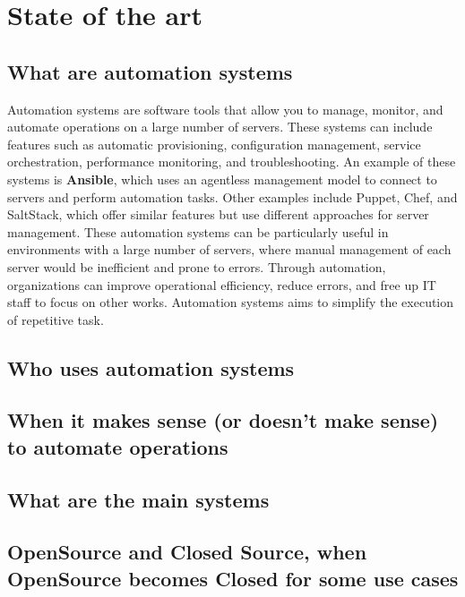 \documentclass[12pt,a4paper,openright,twoside]{book}
\begin{document}
\chapter{State of the art}

\section{What are automation systems}
Automation systems are software tools that allow you to manage, monitor, and automate operations on a large number of servers. These systems can include features such as automatic provisioning, configuration management, service orchestration, performance monitoring, and troubleshooting.
An example of these systems is \textbf{Ansible}, which uses an agentless management model to connect to servers and perform automation tasks. Other examples include Puppet, Chef, and SaltStack, which offer similar features but use different approaches for server management.
These automation systems can be particularly useful in environments with a large number of servers, where manual management of each server would be inefficient and prone to errors. Through automation, organizations can improve operational efficiency, reduce errors, and free up IT staff to focus on other works.
Automation systems aims to simplify the execution of repetitive task.

\section{Who uses automation systems}

\section{When it makes sense (or doesn't make sense) to automate operations}

\section{What are the main systems}

\section{OpenSource and Closed Source, when OpenSource becomes Closed for some use cases}


\end{document}
